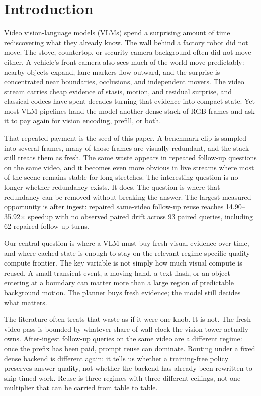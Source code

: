 \section{Introduction}

Video vision-language models (VLMs) spend a surprising amount of time
rediscovering what they already know. The wall behind a factory robot did not
move. The stove, countertop, or
security-camera background often did not move either. A vehicle's front camera
also sees much of the world move predictably: nearby objects expand, lane
markers flow outward, and the surprise is concentrated near boundaries,
occlusions, and independent movers. The video stream carries cheap evidence of
stasis, motion, and residual surprise, and classical codecs have spent decades
turning that evidence into compact state. Yet most VLM pipelines hand the model
another dense stack of RGB frames and ask it to pay again for vision encoding,
prefill, or both.

That repeated payment is the seed of this paper. A benchmark clip is sampled
into several frames, many of those frames are visually redundant, and the stack
still treats them as fresh. The same waste appears in repeated follow-up
questions on the same video, and it becomes even more obvious in live streams
where most of the scene remains stable for long stretches. The interesting
question is no longer whether redundancy exists. It does. The question is
where that redundancy can be removed without breaking the answer.
The largest measured opportunity is after ingest: repaired same-video
follow-up reuse reaches 14.90--35.92$\times$ speedup with no observed paired
drift across 93 paired queries, including 62 repaired follow-up turns.

Our central question is where a VLM must buy fresh visual evidence over time,
and where cached state is enough to stay on the relevant regime-specific
quality--compute frontier. The key variable is not simply how much visual
compute is reused. A small transient event, a moving hand, a text flash, or an
object entering at a boundary can matter more than a large region of
predictable background motion. The planner buys fresh evidence; the model
still decides what matters.

The literature often treats that waste as if it were one knob. It is not. The
fresh-video pass is bounded by whatever share of wall-clock the vision tower
actually owns. After-ingest follow-up queries on the same video are a
different regime: once the prefix has been paid, prompt reuse can dominate.
Routing under a fixed dense backend is different again: it tells us whether a
training-free policy preserves answer quality, not whether the backend has
already been rewritten to skip timed work. Reuse is three regimes with three
different ceilings, not one multiplier that can be carried from table to table.

